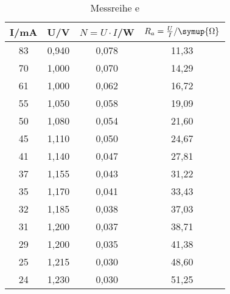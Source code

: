 

\begin{table}[h!]
  \centering
  \caption{Messreihe e}
  \label{tab:Leistung}
  \begin{tabular}{c c c c}
    \toprule
     I/mA  &	 U/V	& $N=U \cdot I$/W  & $R_{a}=\frac{U}{I}/\symup{\Omega}$ \\
    \midrule
   83  & 0,940	&  0,078    & 11,33 \\
   70  & 1,000	&  0,070    & 14,29 \\
   61  & 1,000	&  0,062    & 16,72 \\
   55  & 1,050	&  0,058    & 19,09 \\
   50  & 1,080	&  0,054    & 21,60 \\
   45  & 1,110	&  0,050    & 24,67 \\
   41  & 1,140	&  0,047    & 27,81 \\
   37  & 1,155	&  0,043    & 31,22 \\
   35  & 1,170	&  0,041    & 33,43 \\
   32  & 1,185	&  0,038    & 37,03 \\
   31  & 1,200  &  0,037    & 38,71 \\
   29  & 1,200  &  0,035    & 41,38 \\
   25  & 1,215	&  0,030    & 48,60 \\
   24  & 1,230	&  0,030    & 51,25 \\

    \bottomrule
  \end{tabular}
\end{table}
